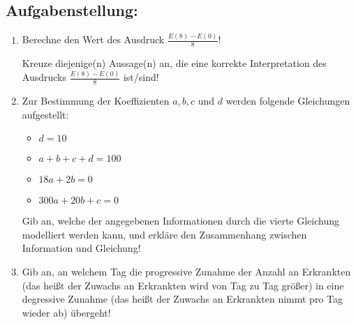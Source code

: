 \begin{langesbeispiel}
\subsection{Aufgabenstellung:}
\begin{enumerate}
	\item Berechne den Wert des Ausdruck $\frac{E(8)-E(0)}{8}$!
	
	Kreuze diejenige(n) Aussage(n) an, die eine korrekte Interpretation des Ausdrucks $\frac{E(8)-E(0)}{8}$ ist/sind!\leer
	
						
		\item Zur Bestimmung der Koeffizienten $a,b,c$ und $d$ werden folgende Gleichungen aufgestellt:
		
		\begin{itemize}
		\item $d=10$
		\item $a+b+c+d=100$
		\item $18a+2b=0$
		\item $300a+20b+c=0$
		\end{itemize}
		
		Gib an, welche der angegebenen Informationen durch die vierte Gleichung modelliert werden kann, und erkläre den Zusammenhang zwischen Information und Gleichung!
		
		\item Gib an, an welchem Tag die progressive Zunahme der Anzahl an Erkrankten (das heißt der Zuwachs an Erkrankten wird von Tag zu Tag größer) in eine degressive Zunahme (das heißt der Zuwachs an Erkrankten nimmt pro Tag wieder ab) übergeht!
		

\end{enumerate}
\end{langesbeispiel}
